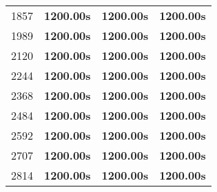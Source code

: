 \begin{tabular}{|l|l|l|l|}
             1857 &    \textbf{1200.00s} & \textbf{1200.00s} &     \textbf{1200.00s} \\
             1989 &    \textbf{1200.00s} & \textbf{1200.00s} &     \textbf{1200.00s} \\
             2120 &    \textbf{1200.00s} & \textbf{1200.00s} &     \textbf{1200.00s} \\
             2244 &    \textbf{1200.00s} & \textbf{1200.00s} &     \textbf{1200.00s} \\
             2368 &    \textbf{1200.00s} & \textbf{1200.00s} &     \textbf{1200.00s} \\
             2484 &    \textbf{1200.00s} & \textbf{1200.00s} &     \textbf{1200.00s} \\
             2592 &    \textbf{1200.00s} & \textbf{1200.00s} &     \textbf{1200.00s} \\
             2707 &    \textbf{1200.00s} & \textbf{1200.00s} &     \textbf{1200.00s} \\
             2814 &    \textbf{1200.00s} & \textbf{1200.00s} &     \textbf{1200.00s} \\
\bottomrule
\end{tabular}
